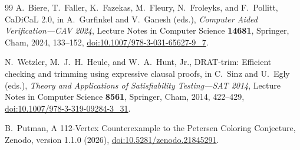 \documentclass[11pt]{article}
\begin{document}
\begin{thebibliography}{99}
\newpage
{}
A.~Biere, T.~Faller, K.~Fazekas, M.~Fleury, N.~Froleyks, and F.~Pollitt,
CaDiCaL 2.0,
in A.~Gurfinkel and V.~Ganesh (eds.),
\emph{Computer Aided Verification---CAV 2024},
Lecture Notes in Computer Science \textbf{14681}, Springer, Cham, 2024,
133--152,
\href{https://doi.org/10.1007/978-3-031-65627-9_7}{doi:10.1007/978-3-031-65627-9\_7}.

N.~Wetzler, M.~J.~H.~Heule, and W.~A.~Hunt, Jr.,
DRAT-trim: Efficient checking and trimming using expressive clausal proofs,
in C.~Sinz and U.~Egly (eds.),
\emph{Theory and Applications of Satisfiability Testing---SAT 2014},
Lecture Notes in Computer Science \textbf{8561}, Springer, Cham, 2014,
422--429,
\href{https://doi.org/10.1007/978-3-319-09284-3_31}{doi:10.1007/978-3-319-09284-3\_31}.

B.~Putman,
A 112-Vertex Counterexample to the Petersen Coloring Conjecture,
Zenodo, version 1.1.0 (2026),
\href{https://doi.org/10.5281/zenodo.21845291}{doi:10.5281/zenodo.21845291}.

\end{thebibliography}
\end{document}

